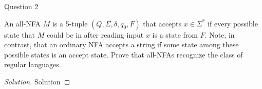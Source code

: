 \begin{solution}{Question 2}\label{ques:2}
    \begin{question}
     An all-NFA $M$ is a 5-tuple $(Q,\Sigma,\delta,q_0,F)$ that accepts $x \in \Sigma^*$ if every possible state that $M$ could be in after reading input $x$ is a state from $F$. Note, in contrast, that an ordinary NFA accepts a string if some state among these possible states is an accept state.  Prove that all-NFAs recognize the class of regular languages.
    \end{question}
    \tcblower{}
    \begin{proof}[Solution]
        Solution
    \end{proof}
\end{solution}
